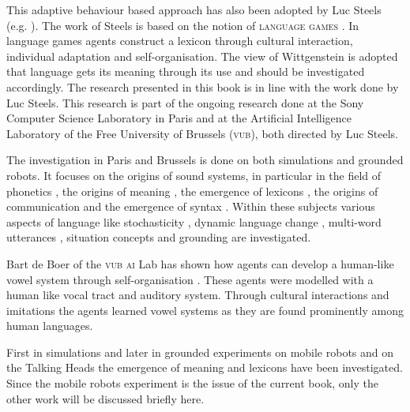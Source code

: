 This adaptive behaviour based approach has also been adopted by Luc Steels (e.g. \citealt{steels:1996a,steels:1996b,steels:1997b}). The work of Steels is based on the notion of {\scshape language games} \citep{wittgenstein:1958}. In language games agents construct a lexicon through cultural interaction, individual adaptation and self-organisation. The view of Wittgenstein is adopted that language gets its meaning through its use and should be investigated accordingly. The research presented in this book is in line with the work done by Luc Steels. This research is part of the ongoing research done at the Sony Computer Science Laboratory in Paris and at the Artificial Intelligence Laboratory of the Free University of Brussels {\scshape (vub)}, both directed by Luc Steels. 

The investigation in Paris and Brussels is done on both simulations and ground\-ed robots. It focuses on the origins of sound systems, in particular in the field of phonetics \citep{deboer:1997,deboer:1999,oudeyer:1999}, the origins of meaning \citep{steels:1996b,steelsvogt:1997,dejongvogt:1998,vogt:1998a,dejong:1999}, the emergence of lexicons \citep{steels:1996a,steelskaplan:1998,kaplan:2000,vogt:1998b,vanlooveren:1999}, the origins of communication \citep{dejong:1999c,dejong:2000} and the emergence of syntax \citep{steels:2000a}. Within these subjects various aspects of language like stochasticity \citep{steelskaplan:1998,kaplan:2000}, dynamic language change \citep{steels:1997c,steelsmcintyre:1999,deboervogt:1999}, multi-word utterances \citep{vanlooveren:1999}, situation concepts \citep{dejong:99b} and grounding \citep{belpaeme:1998,steelsvogt:1997,steels:2000,kaplan:2000} are investigated.

Bart de Boer of the {\scshape vub ai} Lab has shown how agents can develop a human-like vowel system through self-organisation \citep{deboer:1997,deboer:1999}. These agents were modelled with a human like vocal tract and auditory system. Through cultural interactions and imitations the agents learned vowel systems as they are found prominently among human languages. 


First in simulations \citep{steels:1996a,steels:1996b} and later in grounded experiments on mobile robots \citep{steelsvogt:1997,vogt:1998a,vogt:1998b,dejongvogt:1998} and on the Talking Heads \citep{belpaeme:1998,kaplan:2000,steels:2000} the emergence of meaning and lexicons have been investigated. Since the mobile robots experiment is the issue of the current book, only the other work will be discussed briefly here. 

